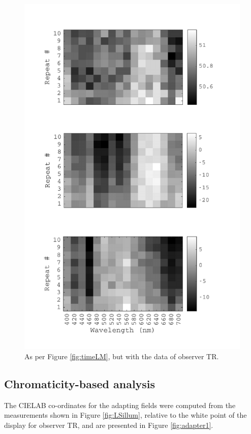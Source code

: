 \begin{figure}[htbp]
\includegraphics[max width=1.2\textwidth, center]{figs/LargeSphere/TRdataOverTime.pdf}
\caption{As per Figure \ref{fig:timeLM}, but with the data of observer TR.}
\label{fig:timeTR}
\end{figure}


\clearpage


\subsection{Chromaticity-based analysis}

The CIELAB co-ordinates for the adapting fields were computed from the measurements shown in Figure \ref{fig:LSillum}, relative to the white point of the display for observer TR, and are presented in Figure \ref{fig:adapter1}. 

